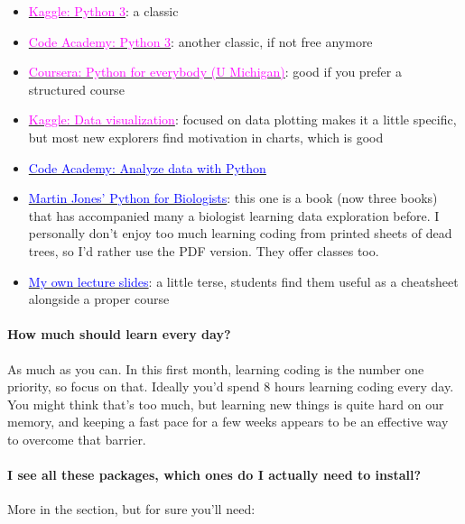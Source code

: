 \documentclass[12pt,a4paper,notitlepage,onecolumn]{article}
\begin{document}
\begin{itemize}
\item \href{https://www.kaggle.com/learn/python}{\textcolor{magenta}{Kaggle: Python 3}}: a classic
\item \href{https://www.codecademy.com/learn/learn-python-3}{\textcolor{magenta}{Code Academy: Python 3}}: another classic, if not free anymore
\item \href{https://www.coursera.org/specializations/python}{\textcolor{magenta}{Coursera: Python for everybody (U Michigan)}}: good if you prefer a structured course
\item \href{https://www.kaggle.com/learn/data-visualization}{\textcolor{magenta}{Kaggle: Data visualization}}: focused on data plotting makes it a little specific, but most new explorers find motivation in charts, which is good
\item \href{https://www.codecademy.com/learn/paths/analyze-data-with-python}{\textcolor{blue}{Code Academy: Analyze data with Python}}
\item \href{https://pythonforbiologists.com/}{\textcolor{blue}{Martin Jones' Python for Biologists}}: this one is a book (now three books) that has accompanied many a biologist learning data exploration before. I personally don't enjoy too much learning coding from printed sheets of dead trees, so I'd rather use the PDF version. They offer classes too.
\item \href{http://fabilab.org/pages/teaching.html}{\textcolor{blue}{My own lecture slides}}: a little terse, students find them useful as a cheatsheet alongside a proper course
\end{itemize}

\paragraph{How much should learn every day?} As much as you can. In this first month, learning coding is the number one priority, so focus on that. Ideally you'd spend 8 hours learning coding every day. You might think that's too much, but learning new things is quite hard on our memory, and keeping a fast pace for a few weeks appears to be an effective way to overcome that barrier.

\paragraph{I see all these packages, which ones do I actually need to install?} More in the  section, but for sure you'll need:
\end{document}
